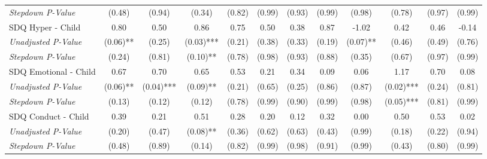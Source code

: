\begin{tabular}{l c c c c c c c c c c c}
\quad \textit{Stepdown P-Value} & (0.48) & (0.94) & (0.34) & (0.82) & (0.99) & (0.93) & (0.99) & (0.98) & (0.78) & (0.97) & (0.99) \\
SDQ Hyper - Child & 0.80 & 0.50 & 0.86 & 0.75 & 0.50 & 0.38 & 0.87 & -1.02 & 0.42 & 0.46 & -0.14 \\
\quad \textit{Unadjusted P-Value} & (0.06)** & (0.25) & (0.03)*** & (0.21) & (0.38) & (0.33) & (0.19) & (0.07)** & (0.46) & (0.49) & (0.76) \\
\quad \textit{Stepdown P-Value} & (0.24) & (0.81) & (0.10)** & (0.78) & (0.98) & (0.93) & (0.88) & (0.35) & (0.67) & (0.97) & (0.99) \\
SDQ Emotional - Child & 0.67 & 0.70 & 0.65 & 0.53 & 0.21 & 0.34 & 0.09 & 0.06 & 1.17 & 0.70 & 0.08 \\
\quad \textit{Unadjusted P-Value} & (0.06)** & (0.04)*** & (0.09)** & (0.21) & (0.65) & (0.25) & (0.86) & (0.87) & (0.02)*** & (0.24) & (0.81) \\
\quad \textit{Stepdown P-Value} & (0.13) & (0.12) & (0.12) & (0.78) & (0.99) & (0.90) & (0.99) & (0.98) & (0.05)*** & (0.81) & (0.99) \\
SDQ Conduct - Child & 0.39 & 0.21 & 0.51 & 0.28 & 0.20 & 0.12 & 0.32 & 0.00 & 0.50 & 0.53 & 0.02 \\
\quad \textit{Unadjusted P-Value} & (0.20) & (0.47) & (0.08)** & (0.36) & (0.62) & (0.63) & (0.43) & (0.99) & (0.18) & (0.22) & (0.94) \\
\quad \textit{Stepdown P-Value} & (0.48) & (0.89) & (0.14) & (0.82) & (0.99) & (0.98) & (0.91) & (0.99) & (0.43) & (0.80) & (0.99) \\
\bottomrule
\end{tabular}
